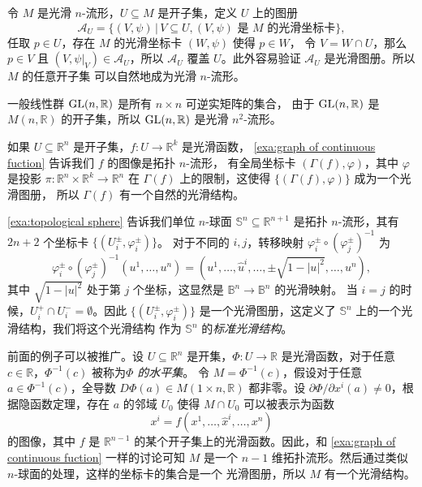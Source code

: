 \begin{example}[开子流形]
  令 $M$ 是光滑 $n$-流形，$U\subseteq M$ 是开子集，定义 $U$ 上的图册
  \[
    \mathcal{A}_U=\{(V,\psi)\,|\,V\subseteq U,\text{$(V,\psi)$ 是 $M$ 的光滑坐标卡}\},  
  \]
  任取 $p\in U$，存在 $M$ 的光滑坐标卡 $(W,\psi)$ 使得 $p\in W$，
  令 $V=W\cap U$，那么 $p\in V$ 且 $(V,\psi|_V)\in\mathcal{A}_U$，所以 $\mathcal{A}_U$
  覆盖 $U$。此外容易验证 $\mathcal{A}_U$ 是光滑图册。所以 $M$ 的任意开子集
  可以自然地成为光滑 $n$-流形。
\end{example}

\begin{example}[一般线性群]
  一般线性群 $\operatorname{GL}(n,\mathbb{R})$ 是所有 $n\times n$ 可逆实矩阵的集合，
  由于 $\operatorname{GL}(n,\mathbb{R})$ 是 $M(n,\mathbb{R})$ 的开子集，所以 $\operatorname{GL}(n,\mathbb{R})$
  是光滑 $n^2$-流形。
\end{example}

\begin{example}[光滑函数的图像]
  如果 $U\subseteq\mathbb{R}^n$ 是开子集，$f:U\to\mathbb{R}^k$ 是光滑函数，
  \autoref{exa:graph of continuous fuction} 告诉我们 $f$ 的图像是拓扑 $n$-流形，
  有全局坐标卡 $(\Gamma(f),\varphi)$，其中 $\varphi$ 是投影 $\pi:\mathbb{R}^{n}\times\mathbb{R}^k\to\mathbb{R}^n$
  在 $\Gamma(f)$ 上的限制，这使得 $\{(\Gamma(f),\varphi)\}$ 成为一个光滑图册，
  所以 $\Gamma(f)$ 有一个自然的光滑结构。
\end{example}

\begin{example}[球面]
  \autoref{exa:topological sphere} 告诉我们单位 $n$-球面 $\mathbb{S}^n\subseteq\mathbb{R}^{n+1}$
  是拓扑 $n$-流形，其有 $2n+2$ 个坐标卡 $\{(U_i^\pm,\varphi_i^\pm)\}$。
  对于不同的 $i,j$，转移映射 $\varphi_i^\pm\circ(\varphi_j^\pm)^{-1}$ 为
  \[
    \varphi_i^\pm\circ(\varphi_j^\pm)^{-1}(u^1,\dots,u^{n})=
    \left(u^1,\dots,\hat{u}^i,\dots,\pm\sqrt{1-|u|^2},\dots,u^n\right),
  \]
  其中 $\sqrt{1-|u|^2}$ 处于第 $j$ 个坐标，这显然是 $\mathbb{B}^n\to\mathbb{B}^n$ 的光滑映射。
  当 $i=j$ 的时候，$U_i^+\cap U_i^-=\emptyset$。因此 $\{(U_i^\pm,\varphi_i^\pm)\}$
  是一个光滑图册，这定义了 $\mathbb{S}^n$ 上的一个光滑结构，我们将这个光滑结构
  作为 $\mathbb{S}^n$ 的\emph{标准光滑结构}。
\end{example}

\begin{example}[水平集]
  前面的例子可以被推广。设 $U\subseteq\mathbb{R}^n$ 是开集，$\Phi:U\to\mathbb{R}$
  是光滑函数，对于任意 $c\in\mathbb{R}$，$\Phi^{-1}(c)$ 被称为\emph{$\Phi$ 的水平集}。
  令 $M=\Phi^{-1}(c)$，假设对于任意 $a\in\Phi^{-1}(c)$，全导数 $D\Phi(a)\in M(1\times n,\mathbb{R})$
  都非零。设 $\partial\Phi/\partial x^i(a)\neq 0$，根据隐函数定理，存在 $a$
  的邻域 $U_0$ 使得 $M\cap U_0$ 可以被表示为函数
  \[
    x^i=f(x^1,\dots,\hat{x}^i,\dots,x^n)  
  \]
  的图像，其中 $f$ 是 $\mathbb{R}^{n-1}$ 的某个开子集上的光滑函数。因此，和
  \autoref{exa:graph of continuous fuction} 一样的讨论可知 $M$ 是一个
  $n-1$ 维拓扑流形。然后通过类似 $n$-球面的处理，这样的坐标卡的集合是一个
  光滑图册，所以 $M$ 有一个光滑结构。
\end{example}

